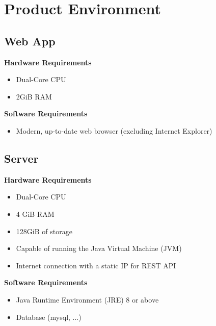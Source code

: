 \section{Product Environment}

\subsection{Web App}

\textbf{Hardware Requirements}
\begin{itemize}
    \item Dual-Core CPU
    \item 2GiB RAM
\end{itemize}

\textbf{Software Requirements}
\begin{itemize}
    \item Modern, up-to-date web browser (excluding Internet Explorer)
\end{itemize}

\subsection{Server}

\textbf{Hardware Requirements}
\begin{itemize}
    \item Dual-Core CPU
    \item 4 GiB RAM
    \item 128GiB of storage
    \item Capable of running the Java Virtual Machine (JVM)
    \item Internet connection with a static IP for REST API
\end{itemize}

\textbf{Software Requirements}
\begin{itemize}
    \item Java Runtime Environment (JRE) 8 or above
    \item Database (mysql, ...)
\end{itemize}

